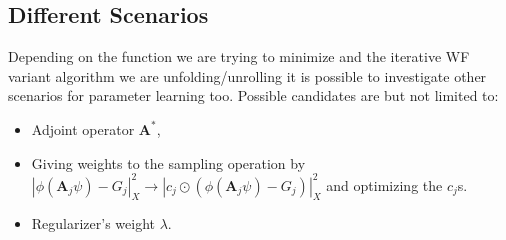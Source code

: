 \subsection*{Different Scenarios}

Depending on the function we are trying to minimize and the iterative \ac{WF}\cite{Jaganathan2015}\cite{Liu2019} variant algorithm we are unfolding/unrolling 
it is possible to investigate other scenarios for parameter learning too. Possible candidates are but not limited to:

\begin{itemize}
  \item Adjoint operator $\boldsymbol{A}^*$,
  \item Giving weights to the sampling operation by $\left|\phi(\boldsymbol{A}_j\psi)-G_j\right|_X^2 \rightarrow \left|c_j \odot \left(\phi(\boldsymbol{A}_j\psi)-G_j\right)\right|_X^2$ and optimizing the $c_j$s.
  \item Regularizer's weight $\lambda$.
\end{itemize}
















